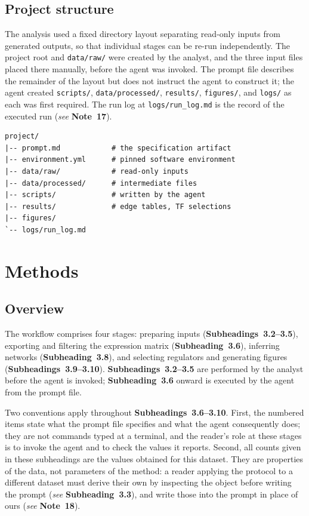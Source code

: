 \documentclass[11pt,a4paper]{article}
\newcommand{\seenote}[1]{(\textit{see} \textbf{Note~#1})}
\newcommand{\seesub}[1]{(\textit{see} \textbf{Subheading~#1})}
\begin{document}
\subsection{Project structure}

The analysis used a fixed directory layout separating read-only inputs from generated outputs, so that individual stages can be re-run independently. The project root and \texttt{data/raw/} were created by the analyst, and the three input files placed there manually, before the agent was invoked. The prompt file describes the remainder of the layout but does not instruct the agent to construct it; the agent created \texttt{scripts/}, \texttt{data/processed/}, \texttt{results/}, \texttt{figures/}, and \texttt{logs/} as each was first required. The run log at \texttt{logs/run\_log.md} is the record of the executed run \seenote{17}.

\begin{lstlisting}
project/
|-- prompt.md            # the specification artifact
|-- environment.yml      # pinned software environment
|-- data/raw/            # read-only inputs
|-- data/processed/      # intermediate files
|-- scripts/             # written by the agent
|-- results/             # edge tables, TF selections
|-- figures/
`-- logs/run_log.md
\end{lstlisting}

\section{Methods}

\subsection{Overview}

The workflow comprises four stages: preparing inputs (\textbf{Subheadings~3.2--3.5}), exporting and filtering the expression matrix (\textbf{Subheading~3.6}), inferring networks (\textbf{Subheading~3.8}), and selecting regulators and generating figures (\textbf{Subheadings~3.9--3.10}). \textbf{Subheadings~3.2--3.5} are performed by the analyst before the agent is invoked; \textbf{Subheading~3.6} onward is executed by the agent from the prompt file.

Two conventions apply throughout \textbf{Subheadings~3.6--3.10}. First, the numbered items state what the prompt file specifies and what the agent consequently does; they are not commands typed at a terminal, and the reader's role at these stages is to invoke the agent and to check the values it reports. Second, all counts given in these subheadings are the values obtained for this dataset. They are properties of the data, not parameters of the method: a reader applying the protocol to a different dataset must derive their own by inspecting the object before writing the prompt \seesub{3.3}, and write those into the prompt in place of ours \seenote{18}.
\end{document}

